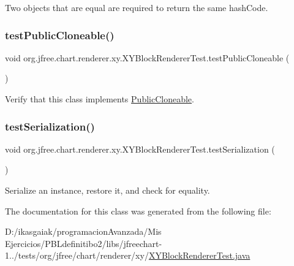 Two objects that are equal are required to return the same hash\+Code. \mbox{\label{classorg_1_1jfree_1_1chart_1_1renderer_1_1xy_1_1_x_y_block_renderer_test_ab10ab18b7e0787dc723f514d46b73ac9}} 
\subsubsection{\texorpdfstring{test\+Public\+Cloneable()}{testPublicCloneable()}}
{\footnotesize\ttfamily void org.\+jfree.\+chart.\+renderer.\+xy.\+X\+Y\+Block\+Renderer\+Test.\+test\+Public\+Cloneable (\begin{DoxyParamCaption}{ }\end{DoxyParamCaption})}

Verify that this class implements \mbox{\hyperlink{}{Public\+Cloneable}}. \mbox{\label{classorg_1_1jfree_1_1chart_1_1renderer_1_1xy_1_1_x_y_block_renderer_test_ab00fb5298c13fbe0457dba88f2a86797}} 
\subsubsection{\texorpdfstring{test\+Serialization()}{testSerialization()}}
{\footnotesize\ttfamily void org.\+jfree.\+chart.\+renderer.\+xy.\+X\+Y\+Block\+Renderer\+Test.\+test\+Serialization (\begin{DoxyParamCaption}{ }\end{DoxyParamCaption})}

Serialize an instance, restore it, and check for equality. 

The documentation for this class was generated from the following file\+:\begin{DoxyCompactItemize}
\item 
D\+:/ikasgaiak/programacion\+Avanzada/\+Mis Ejercicios/\+P\+B\+Ldefinitibo2/libs/jfreechart-\/1../tests/org/jfree/chart/renderer/xy/\mbox{\hyperlink{_x_y_block_renderer_test_8java}{X\+Y\+Block\+Renderer\+Test.\+java}}\end{DoxyCompactItemize}
